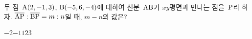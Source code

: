 두 점~$\mathrm{A}(2{,}\mkern3mu\mathopen{}-1{,}\mkern3mu\mathopen{}3)$, $\mathrm{B}(-5{,}\mkern3mu\mathopen{}6{,}\mkern3mu\mathopen{}-4)$에 대하여 선분~$\mathrm{AB}$가 $xy$평면과 만나는 점을~$\mathrm{P}$라 하자. $\overline{\mathrm{AP}}:\overline{\mathrm{BP}}=m:n$일 때, $m-n$의 값은? 
\begin{choices32}{$-2$}{$-1$}{$1$}{$2$}{$3$}\end{choices32}
